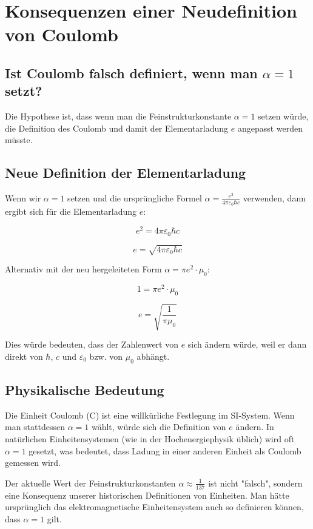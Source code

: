 \documentclass{article}
\begin{document}
	\section{Konsequenzen einer Neudefinition von Coulomb}
	
	\subsection{ Ist Coulomb falsch definiert, wenn man $\alpha = 1$ setzt?}
	
	Die Hypothese ist, dass wenn man die Feinstrukturkonstante $\alpha = 1$ setzen würde, die Definition des Coulomb und damit der Elementarladung $e$ angepasst werden müsste.
	
	\subsection{Neue Definition der Elementarladung}
	
	Wenn wir $\alpha = 1$ setzen und die ursprüngliche Formel $\alpha = \frac{e^2}{4\pi\varepsilon_0\hbar c}$ verwenden, dann ergibt sich für die Elementarladung $e$:
	
	$$e^2 = 4\pi\varepsilon_0\hbar c$$
	
	$$e = \sqrt{4\pi\varepsilon_0\hbar c}$$
	
	Alternativ mit der neu hergeleiteten Form $\alpha = \pi e^2 \cdot \mu_0$:
	
	$$1 = \pi e^2 \cdot \mu_0$$
	
	$$e = \sqrt{\frac{1}{\pi \mu_0}}$$
	
	Dies würde bedeuten, dass der Zahlenwert von $e$ sich ändern würde, weil er dann direkt von $\hbar$, $c$ und $\varepsilon_0$ bzw. von $\mu_0$ abhängt.
	
	\subsection{Physikalische Bedeutung}
	
	Die Einheit Coulomb (C) ist eine willkürliche Festlegung im SI-System. Wenn man stattdessen $\alpha = 1$ wählt, würde sich die Definition von $e$ ändern. In natürlichen Einheitensystemen (wie in der Hochenergiephysik üblich) wird oft $\alpha = 1$ gesetzt, was bedeutet, dass Ladung in einer anderen Einheit als Coulomb gemessen wird.
	
	Der aktuelle Wert der Feinstrukturkonstanten $\alpha \approx \frac{1}{137}$ ist nicht "falsch", sondern eine Konsequenz unserer historischen Definitionen von Einheiten. Man hätte ursprünglich das elektromagnetische Einheitensystem auch so definieren können, dass $\alpha = 1$ gilt.
	
\end{document}
